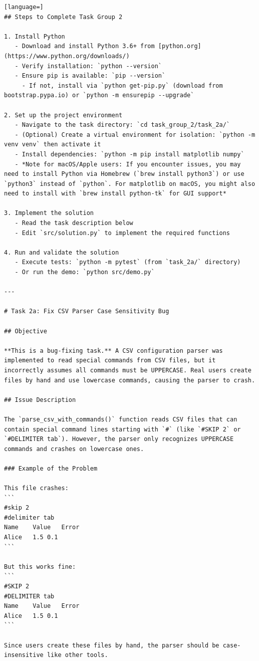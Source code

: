 \begin{appendices}
\begin{lstlisting}[language=]
## Steps to Complete Task Group 2

1. Install Python
   - Download and install Python 3.6+ from [python.org](https://www.python.org/downloads/)
   - Verify installation: `python --version`
   - Ensure pip is available: `pip --version`
     - If not, install via `python get-pip.py` (download from bootstrap.pypa.io) or `python -m ensurepip --upgrade`

2. Set up the project environment
   - Navigate to the task directory: `cd task_group_2/task_2a/`
   - (Optional) Create a virtual environment for isolation: `python -m venv venv` then activate it
   - Install dependencies: `python -m pip install matplotlib numpy`
   - *Note for macOS/Apple users: If you encounter issues, you may need to install Python via Homebrew (`brew install python3`) or use `python3` instead of `python`. For matplotlib on macOS, you might also need to install with `brew install python-tk` for GUI support*

3. Implement the solution
   - Read the task description below
   - Edit `src/solution.py` to implement the required functions

4. Run and validate the solution
   - Execute tests: `python -m pytest` (from `task_2a/` directory)
   - Or run the demo: `python src/demo.py`

---

# Task 2a: Fix CSV Parser Case Sensitivity Bug

## Objective

**This is a bug-fixing task.** A CSV configuration parser was implemented to read special commands from CSV files, but it incorrectly assumes all commands must be UPPERCASE. Real users create files by hand and use lowercase commands, causing the parser to crash.

## Issue Description

The `parse_csv_with_commands()` function reads CSV files that can contain special command lines starting with `#` (like `#SKIP 2` or `#DELIMITER tab`). However, the parser only recognizes UPPERCASE commands and crashes on lowercase ones.

### Example of the Problem

This file crashes:
```
#skip 2
#delimiter tab
Name	Value	Error
Alice	1.5	0.1
```

But this works fine:
```
#SKIP 2
#DELIMITER tab
Name	Value	Error
Alice	1.5	0.1
```

Since users create these files by hand, the parser should be case-insensitive like other tools.


\end{lstlisting}
\end{appendices}
